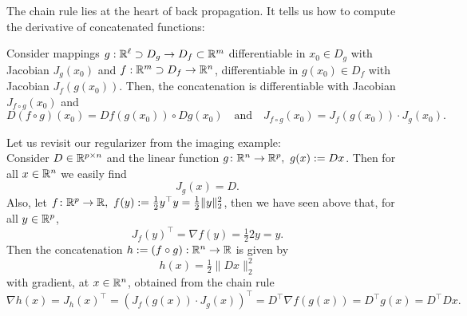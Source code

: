 \begin{frame}
	The chain rule lies at the heart of back propagation. It tells us how to compute the  derivative of concatenated functions:
	\begin{theorem} \label{chain}Consider mappings $g:{\mathbb{R}}^\ell\supset D_g\to D_f\subset{\mathbb{R}}^m$ differentiable in $x_0\in D_g$ with Jacobian $J_g(x_0)$ and $f:{\mathbb{R}}^m\supset D_f\to {\mathbb{R}}^n$, differentiable in $g(x_0)\in D_f$ with Jacobian $J_f(g(x_0))$. Then, the concatenation is differentiable with Jacobian $J_{f\circ g}(x_0)$ and
		\[
		D(f\circ g)(x_0)=Df(g(x_0))\circ Dg(x_0)\text{~~~and~~~}
		\boxed{J_{f\circ g}(x_0)=J_f(g(x_0))\cdot J_g(x_0)}.
		\]
	\end{theorem}
\begin{example}
	Let us revisit our regularizer from the imaging example:\\
	Consider $D\in {\mathbb{R}}^{p \times n}$ and the linear function $g\colon{\mathbb{R}}^{n} \to {\mathbb{R}}^p, ~g(x):= Dx$. Then for all $x\in{\mathbb{R}}^{n}$ we easily find
	$$J_g(x) = D.$$
	Also, let $f\colon {\mathbb{R}}^p \to {\mathbb{R}},~f(y):=\tfrac{1}{2}y^\top y = \tfrac{1}{2} \|y\|_2^2$, then we have seen above that, for all $y\in{\mathbb{R}}^p$,
	$$J_f(y)^\top = \nabla f(y) = \tfrac{1}{2}2y=y. $$
	Then the concatenation $h := (f\circ g): {\mathbb{R}}^{n} \to {\mathbb{R}}$ is given by
	$$h(x) = \tfrac{1}{2} \|Dx\|_2^2 $$
	with gradient, at $x\in {\mathbb{R}}^{n}$, obtained from the chain rule
	$$\nabla h(x) = J_h(x)^\top = \left(J_f(g(x))\cdot J_g(x) \right)^\top = D^\top \nabla f(g(x)) = D^\top  g(x) = D^\top Dx. $$
\end{example}
\end{frame}

